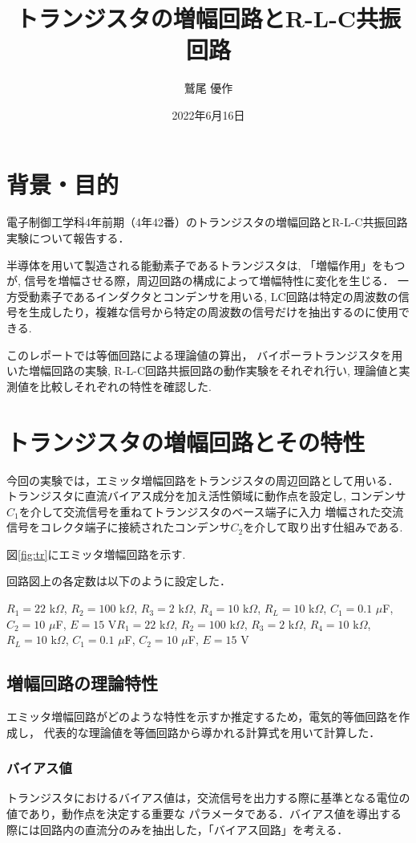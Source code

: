 \documentclass[dvipdfmx,titlepage,a4j]{jsarticle}  %
\title{トランジスタの増幅回路とR-L-C共振回路}
\author{鷲尾 優作}
\date{2022年6月16日}
\numberwithin{equation}{section}
\begin{document}
\pagestyle{foot}

\maketitle

\section{背景・目的}
電子制御工学科4年前期（4年42番）のトランジスタの増幅回路とR-L-C共振回路実験について報告する．

半導体を用いて製造される能動素子であるトランジスタは, 「増幅作用」をもつが, 信号を増幅させる際，周辺回路の構成によって増幅特性に変化を生じる．
一方受動素子であるインダクタとコンデンサを用いる, LC回路は特定の周波数の信号を生成したり，複雑な信号から特定の周波数の信号だけを抽出するのに使用できる.

このレポートでは等価回路による理論値の算出，
バイポーラトランジスタを用いた増幅回路の実験, R-L-C回路共振回路の動作実験をそれぞれ行い,
理論値と実測値を比較しそれぞれの特性を確認した.

\section{トランジスタの増幅回路とその特性}
今回の実験では，エミッタ増幅回路をトランジスタの周辺回路として用いる．
トランジスタに直流バイアス成分を加え活性領域に動作点を設定し,
コンデンサ$C_1$を介して交流信号を重ねてトランジスタのベース端子に入力
増幅された交流信号をコレクタ端子に接続されたコンデンサ$C_2$を介して取り出す仕組みである.

図\ref{fig:tr}にエミッタ増幅回路を示す.

回路図上の各定数は以下のように設定した．

$R_1 = 22$ k$\Omega$, $R_2 = 100$ k$\Omega$, $R_3 = 2$ k$\Omega$, $R_4 = 10$ k$\Omega$,
$R_L = 10$ k$\Omega$, $C_1 = 0.1$ $\mu$F, $C_2 = 10$ $\mu$F, $E = 15$ V$R_1 = 22$ k$\Omega$, $R_2 = 100$ k$\Omega$, $R_3 = 2$ k$\Omega$, $R_4 = 10$ k$\Omega$,
$R_L = 10$ k$\Omega$, $C_1 = 0.1$ $\mu$F, $C_2 = 10$ $\mu$F, $E = 15$ V

\subsection{増幅回路の理論特性}
エミッタ増幅回路がどのような特性を示すか推定するため，電気的等価回路を作成し，
代表的な理論値を等価回路から導かれる計算式を用いて計算した．

\subsubsection{バイアス値}
トランジスタにおけるバイアス値は，交流信号を出力する際に基準となる電位の値であり，動作点を決定する重要な
パラメータである．バイアス値を導出する際には回路内の直流分のみを抽出した，「バイアス回路」を考える．
\end{document}
